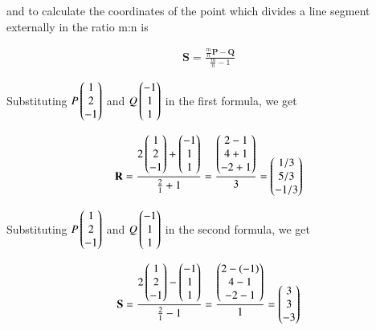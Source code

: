 \documentclass[12pt]{article}
\begin{document}
and to calculate the coordinates of the point which divides a line segment externally in the ratio m:n is 

\begin{align}
    \mathbf{S}=\frac{\frac{m}{n}\mathbf{P}-\mathbf{Q}}{\frac{m}{n}-1}
\end{align}

Substituting $P\begin{pmatrix} 1 \\ 2\\ -1\end{pmatrix}$ and $Q\begin{pmatrix} -1 \\ 1\\ 1\end{pmatrix}$ in the first formula, we get \vspace{0.5cm}

\begin{align}
    \mathbf{R}=\frac{2\begin{pmatrix} 1 \\ 2\\ -1\end{pmatrix}+\begin{pmatrix} -1 \\ 1\\ 1\end{pmatrix}}{\frac{2}{1}+1} = \frac{\begin{pmatrix} 2-1 \\ 4+1\\ -2+1\end{pmatrix}}{3} = \begin{pmatrix} 1/3\\ 5/3\\ -1/3\end{pmatrix}
\end{align}

\vspace{1cm}

Substituting $P\begin{pmatrix} 1 \\ 2\\ -1\end{pmatrix}$ and $Q\begin{pmatrix} -1 \\ 1\\ 1\end{pmatrix}$ in the second formula, we get  \vspace{0.5cm}

\begin{align}
    \mathbf{S}=\frac{2\begin{pmatrix} 1 \\ 2\\ -1\end{pmatrix}-\begin{pmatrix} -1 \\ 1\\ 1\end{pmatrix}}{\frac{2}{1}-1} = \frac{\begin{pmatrix} 2-(-1) \\ 4-1\\ -2-1\end{pmatrix}}{1} = \begin{pmatrix} 3\\ 3\\ -3\end{pmatrix}
\end{align}
\end{document}
